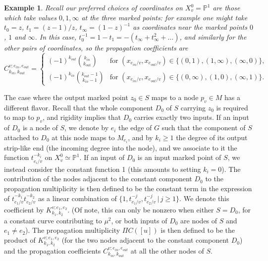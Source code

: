 \documentclass[11pt,leqno]{amsart}
\newtheorem{example}[theo]{Example}
\numberwithin{equation}{section}
\def\PP{{\mathbb P}}
\begin{document}
\begin{example}
Recall our preferred choices of coordinates on $X^0_v=\PP^1$ are those which
take values $0,1,\infty$ at the three marked points: for example one might
take $t_0=z$, $t_1=(z-1)/z$, $t_\infty=(1-z)^{-1}$ as coordinates near
the marked points $0$, $1$ and $\infty$. In this case, $t_0^{-1}=1-t_1=-(t_\infty+t_\infty^2+\dots)$, 
and similarly for the other pairs of coordinates,
so the propagation coefficients are
$$C^{v;e_{in},e_{out}}_{k_{in},k_{out}}=\begin{cases}
\displaystyle (-1)^{k_{out}}\binom{k_{in}}{k_{out}} & \text{for }(x_{e_{in}/v},x_{e_{out}/v})\in\{(0,1),(1,\infty),(\infty,0)\},
\\[10pt]
\displaystyle (-1)^{k_{in}}\binom{k_{out}-1}{k_{in}-1} & \text{for }(x_{e_{in}/v},x_{e_{out}/v})\in\{(0,\infty),(1,0),(\infty,1)\}.
\end{cases}$$
\end{example}
\smallskip

The case where the output marked point $z_0\in S$ maps to a node $p_v\in M$ has a different flavor.
Recall that the whole component $D_0$ of $S$ carrying $z_0$ is required to map to $p_v$, and
rigidity implies that $D_0$ carries exactly two inputs.
If an input of $D_0$ is a node of $S$, we denote by $e_i$ the edge of $G$ such that the component of $S$ attached to $D_0$
at this node maps to $M_{e_i}$, and by $k_i\geq 1$ the degree of its output strip-like end (the incoming degree into the node),
and we associate to it the function $t_{e_i/v}^{-k_i}$ on $X^0_v\simeq \PP^1$.
If an input of $D_0$ is an input marked point of $S$, we instead consider the constant function 1 (this amounts to setting $k_i=0$).
The contribution of the nodes adjacent to the constant component $D_0$ to the
propagation multiplicity is then defined to be the constant term in the
expression of $t_{e_1/v}^{-k_1}t_{e_2/v}^{-k_2}$ as a linear combination
of $\{1, t_{e_1/v}^{-j}, t_{e_2/v}^{-j}\,|\, j\geq 1\}$. We denote this
coefficient by $K^{v;e_1,e_2}_{k_1,k_2}$. (Of note, this can only be nonzero when either
$S=D_0$, for a constant curve contributing to $\mu^2$, or both
inputs of $D_0$ are nodes of $S$ and $e_1\neq e_2$). The propagation 
multiplicity $\Pi C([u])$ is then defined to be the product of
$K^{v;e_1,e_2}_{k_1,k_2}$ (for the two nodes adjacent to the constant component
$D_0$) and the propagation
coefficients $C^{v;e_{in},e_{out}}_{k_{in},k_{out}}$ at all the other nodes
of $S$.
\end{document}
